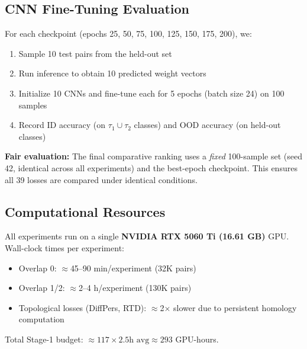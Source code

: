 \subsection{CNN Fine-Tuning Evaluation}

For each checkpoint (epochs 25, 50, 75, 100, 125, 150, 175, 200), we:
\begin{enumerate}
    \item Sample 10 test pairs from the held-out set
    \item Run inference to obtain 10 predicted weight vectors
    \item Initialize 10 CNNs and fine-tune each for 5 epochs (batch size 24) on 100 samples
    \item Record ID accuracy (on $\tau_1\cup\tau_2$ classes) and OOD accuracy (on held-out classes)
\end{enumerate}

\textbf{Fair evaluation:} The final comparative ranking uses a \emph{fixed} 100-sample set (seed 42, identical across all experiments) and the best-epoch checkpoint. This ensures all 39 losses are compared under identical conditions.

\subsection{Computational Resources}

All experiments run on a single \textbf{NVIDIA RTX 5060 Ti (16.61 GB)} GPU. Wall-clock times per experiment:
\begin{itemize}
    \item Overlap 0: $\approx$45--90 min/experiment (32K pairs)
    \item Overlap 1/2: $\approx$2--4 h/experiment (130K pairs)
    \item Topological losses (DiffPers, RTD): $\approx$2$\times$ slower due to persistent homology computation
\end{itemize}

Total Stage-1 budget: $\approx 117 \times 2.5\text{h avg} \approx 293$ GPU-hours.
